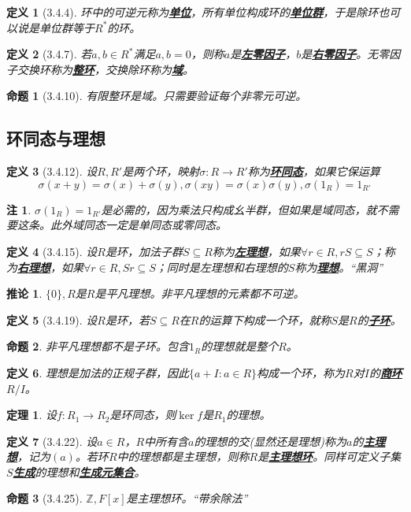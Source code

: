 \documentclass[landscape, a4paper]{article}
\theoremstyle{compact}
\newtheorem{theorem}{定理}
\newtheorem{corollary}{推论}
\newtheorem{definition}{定义}
\newtheorem{proposition}{命题}
\newtheorem{remark}{注}
\def\obj#1{\textbf{\uline{#1}}}
\begin{document}
\begin{multicols}{3}
\begin{definition}[3.4.4]
	环中的可逆元称为\obj{单位}，所有单位构成环的\obj{单位群}，于是除环也可以说是单位群等于$R^*$的环。
\end{definition}
\begin{definition}[3.4.7]
	若$a, b \in R^*$满足$a, b = 0$，则称$a$是\obj{左零因子}，$b$是\obj{右零因子}。无零因子交换环称为\obj{整环}，交换除环称为\obj{域}。
\end{definition}
\begin{proposition}[3.4.10]
	有限整环是域。只需要验证每个非零元可逆。
\end{proposition}
\subsection{环同态与理想}
\begin{definition}[3.4.12]
	设$R, R'$是两个环，映射$\sigma: R \to R'$称为\obj{环同态}，如果它保运算
	$$\sigma(x+y) = \sigma(x) + \sigma(y), \sigma(xy) = \sigma(x)\sigma(y), \sigma(1_R) = 1_{R'}$$
\end{definition}
\begin{remark}
	$\sigma(1_R) = 1_{R'}$是必需的，因为乘法只构成幺半群，但如果是域同态，就不需要这条。此外域同态一定是单同态或零同态。
\end{remark}
\begin{definition}[3.4.15]
	设$R$是环，加法子群$S \subseteq R$称为\obj{左理想}，如果$\forall r \in R, rS \subseteq S$；称为\obj{右理想}，如果$\forall r \in R, Sr \subseteq S$；同时是左理想和右理想的$S$称为\obj{理想}。\textit{“黑洞”}
\end{definition}
\begin{corollary}
	$\{0\}, R$是$R$是平凡理想。非平凡理想的元素都不可逆。
\end{corollary}
\begin{definition}[3.4.19]
	设$R$是环，若$S \subseteq R$在$R$的运算下构成一个环，就称$S$是$R$的\obj{子环}。
\end{definition}
\begin{proposition}
	非平凡理想都不是子环。\textit{包含$1_R$的理想就是整个$R$。}
\end{proposition}
\begin{definition}
	理想是加法的正规子群，因此$\{a + I: a \in R\}$构成一个环，称为$R$对$I$的\obj{商环}$R / I$。
\end{definition}
\begin{theorem}
	设$f: R_1 \to R_2$是环同态，则$\ker f$是$R_1$的理想。
\end{theorem}
\begin{definition}[3.4.22]
	设$a \in R$，$R$中所有含$a$的理想的交(显然还是理想)称为$a$的\obj{主理想}，记为$(a)$。若环$R$中的理想都是主理想，则称$R$是\obj{主理想环}。同样可定义子集$S$\obj{生成}的理想和\obj{生成元集合}。
\end{definition}
\begin{proposition}[3.4.25]
	$\mathbb Z, F[x]$是主理想环。\textit{“带余除法”}
\end{proposition}


\end{multicols}
\end{document}

